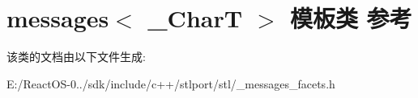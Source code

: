 \hypertarget{classmessages}{}\section{messages$<$ \+\_\+\+CharT $>$ 模板类 参考}
\label{classmessages}


该类的文档由以下文件生成\+:\begin{DoxyCompactItemize}
\item 
E\+:/\+React\+O\+S-\/0../sdk/include/c++/stlport/stl/\+\_\+messages\+\_\+facets.\+h\end{DoxyCompactItemize}
